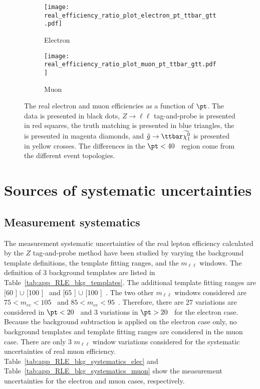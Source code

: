 \begin{figure}[htb]
    \begin{subfigure}[b]{0.48\textwidth}
        \begin{center}
            \texttt{[image: real\_efficiency\_ratio\_plot\_electron\_pt\_ttbar\_gtt.pdf]}
            \caption{Electron}
        \end{center}
    \end{subfigure}
    \begin{subfigure}[b]{0.48\textwidth}
        \begin{center}
            \texttt{[image: real\_efficiency\_ratio\_plot\_muon\_pt\_ttbar\_gtt.pdf]}
            \caption{Muon}
        \end{center}
    \end{subfigure}
    \caption{The real electron and muon efficiencies as a function of $\pt$.
    The data is presented in black dots,  $Z\to \ell\ell$ tag-and-probe is presented in red squares, the truth matching is presented in blue triangles, the \ttbar is presented in magenta diamonds, and $\tilde{g} \to \ttbar \widetilde{\chi^{0}_{1}}$ is presented in yellow crosses.
    The differences in the $\pt < 40$~{\GeV} region come from the different event topologies.}
    \label{fig:app_RLE_real_efficiency_ttbar_gtt}
\end{figure}


\section{Sources of systematic uncertainties}
\label{sec:app_RLE_sources_of_systematic_uncertainties}


\subsection{Measurement systematics}
\label{subsec:app_RLE_bkg_systematics}
The measurement systematic uncertainties of the real lepton efficiency calculated by the $Z$ tag-and-probe method have been studied by varying the background template definitions, the template fitting ranges, and the $m_{\ell \ell}$ windows.
The definition of 3 background templates are listed in Table~\ref{tab:app_RLE_bkg_templates}.
The additional template fitting ranges are [60 ] $\cup$ [100 ]~{\GeV} and [65 ] $\cup$ [100 ]~{\GeV}.
The two other $m_{\ell \ell}$ windows considered are $75 < m_{ee} < 105$~{\GeV} and $85 < m_{ee} < 95$~{\GeV}.
Therefore, there are 27 variations are considered in $\pt < 20$~{\GeV} and 3 variations in $\pt > 20$~{\GeV} for the electron case.
Because the background subtraction is applied on the electron case only, no background templates and template fitting ranges are considered in the muon case.
There are only 3 $m_{\ell \ell}$ window variations considered for the systematic uncertainties of real muon efficiency.
Table~\ref{tab:app_RLE_bkg_systematics_elec} and Table~\ref{tab:app_RLE_bkg_systematics_muon} show the measurement uncertainties for the electron and muon cases, respectively.

